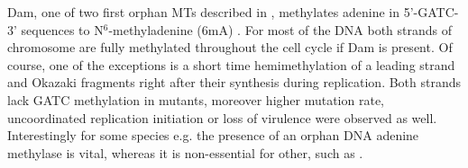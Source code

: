 Dam, one of two first orphan MTs described in , methylates adenine in 5'-GATC-3' sequences to N$^6$-methyladenine (6mA) \cite{marinus1973isolation}.
For most of the DNA both strands of chromosome are fully methylated throughout the cell cycle if Dam is present.
Of course, one of the exceptions is a short time hemimethylation of a leading strand and Okazaki fragments right after their synthesis during replication.
Both strands lack GATC methylation in  mutants, moreover higher mutation rate, uncoordinated replication initiation or loss of virulence were observed as well.
Interestingly for some species e.g.  the presence of an orphan DNA adenine methylase is vital, whereas it is non-essential for other, such as  \cite{casadesus2006epigenetic, casadesus2013programmed, adhikari2016dna}.

